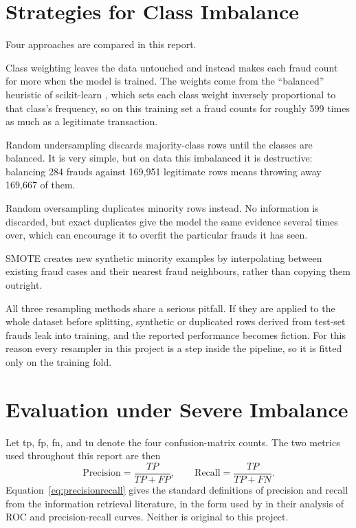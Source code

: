 \section{Strategies for Class Imbalance}

Four approaches are compared in this report.

Class weighting leaves the data untouched and instead makes each fraud count for
more when the model is trained. The weights come from the ``balanced'' heuristic of
scikit-learn \citep{pedregosa2011scikit}, which sets each class weight inversely
proportional to that class's frequency, so on this training set a fraud counts for roughly
599 times as much as a legitimate transaction.

Random undersampling discards majority-class rows until the classes are balanced.
It is very simple, but on data this imbalanced it is destructive: balancing 284 frauds
against 169{,}951 legitimate rows means throwing away 169{,}667 of them.

Random oversampling duplicates minority rows instead. No information is discarded,
but exact duplicates give the model the same evidence several times over, which can
encourage it to overfit the particular frauds it has seen.

SMOTE \citep{chawla2002smote} creates new synthetic minority examples by
interpolating between existing fraud cases and their nearest fraud neighbours, rather than
copying them outright.

All three resampling methods share a serious pitfall. If they are applied to the whole
dataset before splitting, synthetic or duplicated rows derived from test-set frauds leak
into training, and the reported performance becomes fiction. For this reason every
resampler in this project is a step inside the pipeline, so it is fitted only on the
training fold.

\section{Evaluation under Severe Imbalance}

Let \gls{tp}, \gls{fp}, \gls{fn}, and \gls{tn} denote the four confusion-matrix counts. The
two metrics used throughout this report are then
\begin{equation}
  \label{eq:precisionrecall}
  \mathrm{Precision} = \frac{TP}{TP+FP}, \qquad
  \mathrm{Recall} = \frac{TP}{TP+FN}.
\end{equation}
Equation~\ref{eq:precisionrecall} gives the standard definitions of precision and recall
from the information retrieval literature, in the form used by
\citet{davis2006relationship} in their analysis of ROC and precision-recall curves. Neither
is original to this project.

